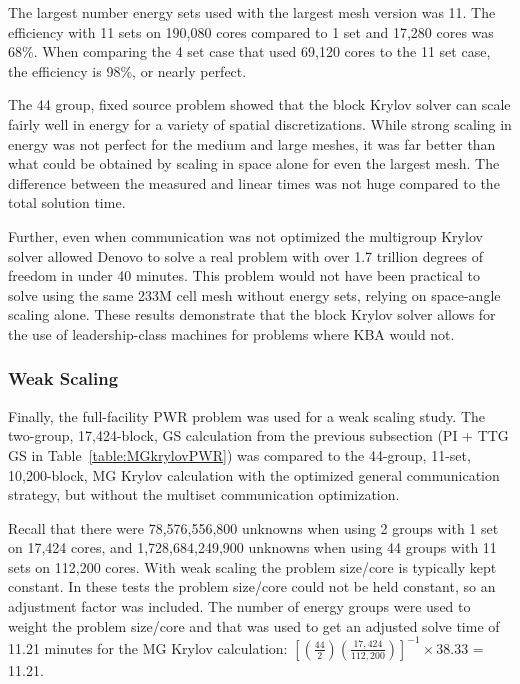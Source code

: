 The largest number energy sets used with the largest mesh version was 11. The efficiency with 11 sets on 190,080 cores compared to 1 set and 17,280 cores was 68\%. When comparing the 4 set case that used 69,120 cores to the 11 set case, the efficiency is 98\%, or nearly perfect. 

The 44 group, fixed source problem showed that the block Krylov solver can scale fairly well in energy for a variety of spatial discretizations. While strong scaling in energy was not perfect for the medium and large meshes, it was far better than what could be obtained by scaling in space alone for even the largest mesh. The difference between the measured and linear times was not huge compared to the total solution time. 

Further, even when communication was not optimized the multigroup Krylov solver allowed Denovo to solve a real problem with over 1.7 trillion degrees of freedom in under 40 minutes. This problem would not have been practical to solve using the same 233M cell mesh without energy sets, relying on space-angle scaling alone. These results demonstrate that the block Krylov solver allows for the use of leadership-class machines for problems where KBA would not.

\subsubsection{Weak Scaling}
Finally, the full-facility PWR problem was used for a weak scaling study. The two-group, 17,424-block, GS calculation from the previous subsection (PI + TTG GS in Table~\ref{table:MGkrylovPWR}) was compared to the 44-group, 11-set, 10,200-block, MG Krylov calculation with the optimized general communication strategy, but without the multiset communication optimization. 

Recall that there were 78,576,556,800 unknowns when using 2 groups with 1 set on 17,424 cores, and 1,728,684,249,900 unknowns when using 44 groups with 11 sets on 112,200 cores. With weak scaling the problem size/core is typically kept constant. In these tests the problem size/core could not be held constant, so an adjustment factor was included. The number of energy groups were used to weight the problem size/core and that was used to get an adjusted solve time of 11.21 minutes for the MG Krylov calculation: $[(\frac{44}{2})(\frac{17,424}{112,200})]^{-1}\times38.33$ = 11.21. 

